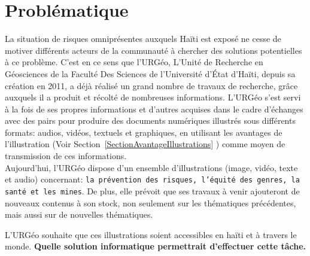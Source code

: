 \section*{Probl\'ematique}%
\label{SectionProblematique}

La situation de risques omnipr\'esentes auxquels Ha\"iti est expos\'e ne cesse de motiver diff\'erents acteurs de la communaut\'e \`a chercher des solutions potentielles \`a ce probl\`eme. C'est en ce sens que l'URG\'eo, L'Unit\'e de Recherche en G\'eosciences de la Facult\'e Des Sciences de l'Universit\'e d'\'Etat d'Ha\"iti, depuis sa cr\'eation en 2011, a d\'ej\`a r\'ealis\'e un grand nombre de travaux de recherche, gr\^ace auxquels il a produit et r\'ecolt\'e de nombreuses informations.  L'URG\'eo s'est servi \`a la fois de ses propres informations et d'autres acquises dans le cadre d'\'echanges avec des pairs  pour produire des documents num\'eriques illustr\'es sous différents formats: audios, vid\'eos, textuels et graphiques, en utilisant les avantages de l'illustration (Voir Section~\ref{SectionAvantageIllustrations} ) comme moyen de transmission de ces informations. \\


\noindent Aujourd'hui, l'URG\'eo dispose d'un ensemble d'illustrations (image, vid\'eo, texte et audio) concernant: \texttt{la pr\'evention des risques, l'\'equit\'e des genres, la sant\'e et les mines}. De plus, elle  pr\'evoit que ses travaux \`a venir ajouteront de nouveaux contenus \`a son stock,  non seulement sur les th\'ematiques pr\'ec\'edentes, mais aussi sur de nouvelles th\'ematiques.\par
\noindent L'URG\'eo souhaite que ces illustrations soient accessibles en ha\"iti et \`a travers le monde. \textbf{Quelle solution informatique permettrait d'effectuer cette t\^ache.}

